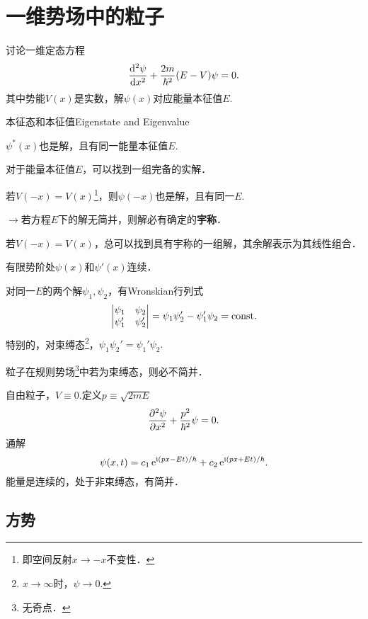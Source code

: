 \section[一维势场]{一维势场中的粒子}
讨论一维定态方程
\begin{align}
	\dv[2]\psi{x}+\frac{2m}{\hbar^2}(E-V)\psi=0.
\end{align}
其中势能$V(x)$是实数，解$\psi(x)$对应能量本征值$E.$
\begin{theorem}{本征态和本征值}{Eigenstate and Eigenvalue}
	\begin{compactenum}
		\item $\psi^*(x)$也是解，且有同一能量本征值$E.$
		\item 对于能量本征值$E$，可以找到一组完备的实解．
		\item 若$V(-x)=V(x)$\footnote{即空间反射$x\to-x$不变性．}，则$\psi(-x)$也是解，且有同一$E.$

		$\to$若方程$E$下的解无简并，则解必有确定的\textbf{宇称}．
		\item 若$V(-x)=V(x)$，总可以找到具有宇称的一组解，其余解表示为其线性组合．
		\item 有限势阶处$\psi(x)$和$\psi'(x)$连续．
		\item 对同一$E$的两个解$\psi_1,\psi_2$，有Wronskian行列式
		\renewcommand\arraystretch{1}
		\begin{align*}
			\begin{vmatrix}
				\psi_1  & \psi_2  \\
				\psi_1' & \psi_2'
			\end{vmatrix}=\psi_1\psi_2'-\psi_1'\psi_2=\cns.
		\end{align*}
		\renewcommand\arraystretch{.82}
		特别的，对束缚态\footnote{$x\to\infty$时，$\psi\to 0.$}，$\psi_1\psi_2'=\psi_1'\psi_2.$
		\item 粒子在规则势场\footnote{无奇点．}中若为束缚态，则必不简并．
	\end{compactenum}
\end{theorem}
自由粒子，$V\equiv 0.$定义$p\equiv\sqrt{2mE}$
\[
	\pu 2\psi{x}+\frac{p^2}{\hbar^2}\psi=0.
\]
通解
\[
	\psi(x,t)=c_1\e{\i(px-Et)/\hbar}+c_2\e{\i(px+Et)/\hbar}.
\]
能量是连续的，处于非束缚态，有简并．

\subsection{方势}
